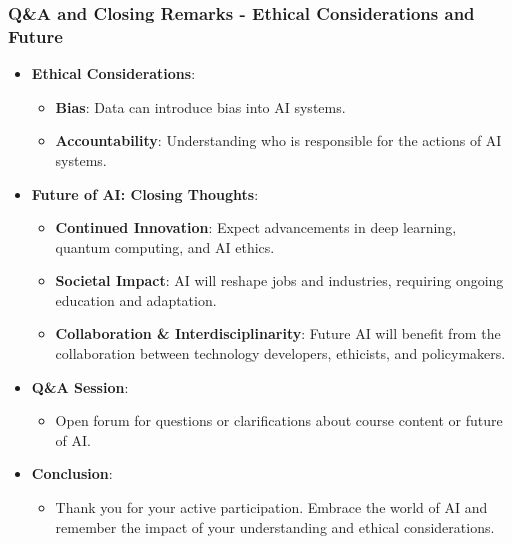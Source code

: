 \documentclass{beamer}
\begin{document}
\begin{frame}[fragile]
    \frametitle{Q\&A and Closing Remarks - Ethical Considerations and Future}
    \begin{itemize}
        \item \textbf{Ethical Considerations}:
        \begin{itemize}
            \item \textbf{Bias}: Data can introduce bias into AI systems.
            \item \textbf{Accountability}: Understanding who is responsible for the actions of AI systems.
        \end{itemize}
        
        \item \textbf{Future of AI: Closing Thoughts}:
        \begin{itemize}
            \item \textbf{Continued Innovation}: Expect advancements in deep learning, quantum computing, and AI ethics.
            \item \textbf{Societal Impact}: AI will reshape jobs and industries, requiring ongoing education and adaptation.
            \item \textbf{Collaboration \& Interdisciplinarity}: Future AI will benefit from the collaboration between technology developers, ethicists, and policymakers.
        \end{itemize}

        \item \textbf{Q\&A Session}:
        \begin{itemize}
            \item Open forum for questions or clarifications about course content or future of AI.
        \end{itemize}
        
        \item \textbf{Conclusion}:
        \begin{itemize}
            \item Thank you for your active participation. Embrace the world of AI and remember the impact of your understanding and ethical considerations.
        \end{itemize}
    \end{itemize}
\end{frame}
\end{document}

